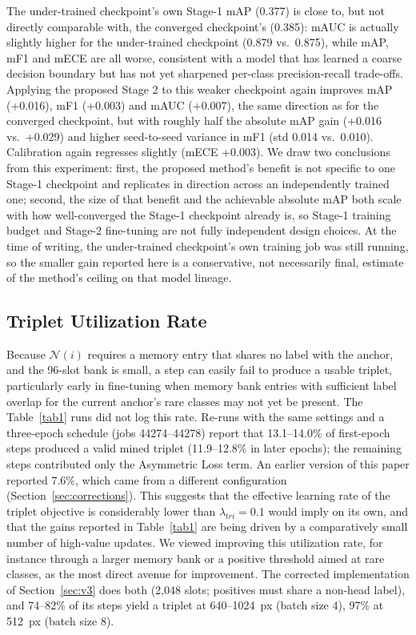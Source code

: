 \documentclass[conference]{IEEEtran}
\begin{document}
The under-trained checkpoint's own Stage-1 mAP (0.377) is close to, but not directly comparable with, the converged checkpoint's (0.385): mAUC is actually slightly higher for the under-trained checkpoint (0.879 vs.\ 0.875), while mAP, mF1 and mECE are all worse, consistent with a model that has learned a coarse decision boundary but has not yet sharpened per-class precision-recall trade-offs. Applying the proposed Stage 2 to this weaker checkpoint again improves mAP (+0.016), mF1 (+0.003) and mAUC (+0.007), the same direction as for the converged checkpoint, but with roughly half the absolute mAP gain (+0.016 vs.\ +0.029) and higher seed-to-seed variance in mF1 (std 0.014 vs.\ 0.010). Calibration again regresses slightly (mECE +0.003). We draw two conclusions from this experiment: first, the proposed method's benefit is not specific to one Stage-1 checkpoint and replicates in direction across an independently trained one; second, the size of that benefit and the achievable absolute mAP both scale with how well-converged the Stage-1 checkpoint already is, so Stage-1 training budget and Stage-2 fine-tuning are not fully independent design choices. At the time of writing, the under-trained checkpoint's own training job was still running, so the smaller gain reported here is a conservative, not necessarily final, estimate of the method's ceiling on that model lineage.

\subsection{Triplet Utilization Rate}
\label{sec:util}
Because $\mathcal{N}(i)$ requires a memory entry that shares no label with the anchor, and the 96-slot bank is small, a step can easily fail to produce a usable triplet, particularly early in fine-tuning when memory bank entries with sufficient label overlap for the current anchor's rare classes may not yet be present. The Table~\ref{tab1} runs did not log this rate. Re-runs with the same settings and a three-epoch schedule (jobs 44274--44278) report that 13.1--14.0\% of first-epoch steps produced a valid mined triplet (11.9--12.8\% in later epochs); the remaining steps contributed only the Asymmetric Loss term. An earlier version of this paper reported 7.6\%, which came from a different configuration (Section~\ref{sec:corrections}). This suggests that the effective learning rate of the triplet objective is considerably lower than $\lambda_{tri}{=}0.1$ would imply on its own, and that the gains reported in Table~\ref{tab1} are being driven by a comparatively small number of high-value updates. We viewed improving this utilization rate, for instance through a larger memory bank or a positive threshold aimed at rare classes, as the most direct avenue for improvement. The corrected implementation of Section~\ref{sec:v3} does both (2,048 slots; positives must share a non-head label), and 74--82\% of its steps yield a triplet at 640--1024~px (batch size 4), 97\% at 512~px (batch size 8).
\end{document}
